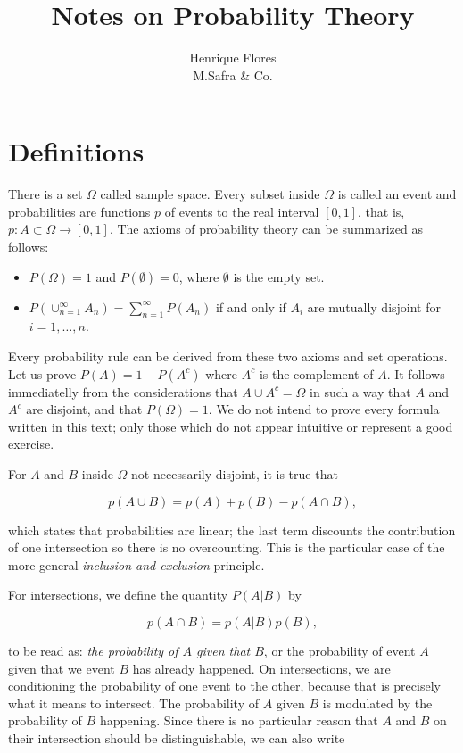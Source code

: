 \documentclass[12pt]{article}
\title{Notes on Probability Theory}
\author{Henrique Flores \\ M.Safra \& Co.}
\date{}
\begin{document}
\maketitle
\tableofcontents

\section{Definitions}
There is a set $\Omega$ called sample space.
Every subset inside $\Omega$ is called an event and probabilities are
functions $p$ of events to the real interval $[0, 1]$, that is, $p: A \subset \Omega \to [0,1]$.
The axioms of probability theory can be summarized as follows:

\begin{itemize}
\item $P(\Omega) = 1$ and $P(\emptyset) = 0$, where $\emptyset$ is the empty set.
\item $P \left( \cup_{n = 1}^{\infty} A_{n} \right) = \sum_{n = 1}^{\infty} P(A_{n})$ if
and only if $A_{i}$ are mutually disjoint for $i = 1, \ldots, n$.
\end{itemize}

\noindent
Every probability rule can be derived from these two axioms and set operations.
Let us prove $P(A) = 1 - P(A^{c})$ where $A^{c}$ is the complement of $A$.
It follows immediatelly from the considerations that $ A \cup A^{c} = \Omega$ in such a way that
$A$ and $A^{c}$ are disjoint, and that $P(\Omega) = 1$.
We do not intend to prove every formula written in this text; 
only those which do not appear intuitive or represent a good exercise.

For $A$ and $B$ inside $\Omega$ not necessarily disjoint, it is true that 

\begin{equation}
p(A \cup B) = p(A) + p(B) - p(A \cap B),
\end{equation}

\noindent
which states that probabilities are linear; the last term
discounts the contribution of one intersection so there is no overcounting. 
This is the particular case of the more general \textit{inclusion and exclusion}
principle.

For intersections, we define the quantity $P(A | B)$ by

\begin{equation} \label{intersection1}
p(A \cap B) = p( A | B ) p( B ),
\end{equation}

\noindent
to be read as: \textit{the probability of $A$ given that $B$},
or the probability of event $A$ given that we event $B$ has already happened.
On intersections, we are conditioning the probability of one event to the other,
because that is precisely what it means to intersect. The probability of $A$ given $B$
is modulated by the probability of $B$ happening.
Since there is no particular reason that $A$ and $B$ on their intersection should be distinguishable,
we can also write
\end{document}
